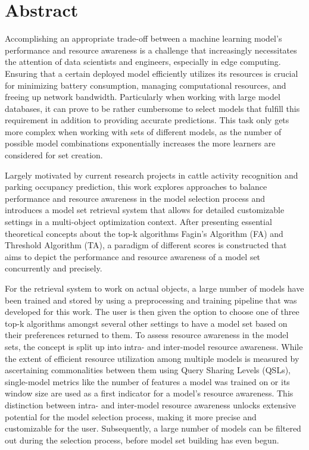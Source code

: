 \chapter*{Abstract}
 
 
 Accomplishing an appropriate trade-off between a machine learning model's performance and resource awareness is a challenge that increasingly necessitates the attention of data scientists and engineers, especially in edge computing. Ensuring that a certain deployed model efficiently utilizes its resources is crucial for minimizing battery consumption, managing computational resources, and freeing up network bandwidth. Particularly when working with large model databases, it can prove to be rather cumbersome to select models that fulfill this requirement in addition to providing accurate predictions. This task only gets more complex when working with sets of different models, as the number of possible model combinations exponentially increases the more learners are considered for set creation.
  
 Largely motivated by current research projects in cattle activity recognition and parking occupancy prediction, this work explores approaches to balance performance and resource awareness in the model selection process and introduces a model set retrieval system that allows for detailed customizable settings in a multi-object optimization context. After presenting essential theoretical concepts about the top-k algorithms Fagin's Algorithm (FA) and Threshold Algorithm (TA), a paradigm of different scores is constructed that aims to depict the performance and resource awareness of a model set concurrently and precisely. 
 
  For the retrieval system to work on actual objects, a large number of models have been trained and stored by using a preprocessing and training pipeline that was developed for this work. The user is then given the option to choose one of three top-k algorithms amongst several other settings to have a model set based on their preferences returned to them. To assess resource awareness in the model sets, the concept is split up into intra- and inter-model resource awareness. While the extent of efficient resource utilization among multiple models is measured by ascertaining commonalities between them using Query Sharing Levels (QSLs), single-model metrics like the number of features a model was trained on or its window size are used as a first indicator for a model's resource awareness. This distinction between intra- and inter-model resource awareness unlocks extensive potential for the model selection process, making it more precise and customizable for the user. Subsequently, a large number of models can be filtered out during the selection process, before model set building has even begun.
 
